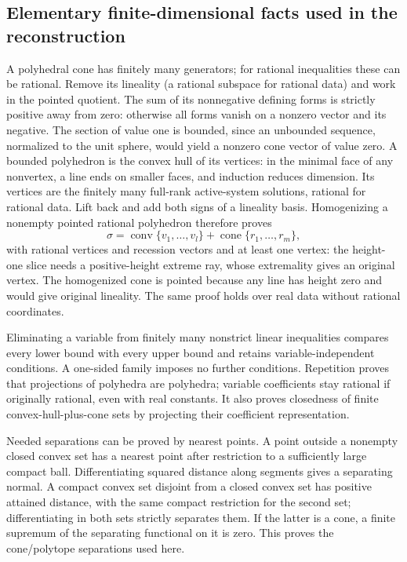 \documentclass[
  11pt,
]{article}
\begin{document}
\subsection{Elementary finite-dimensional facts used in the
reconstruction}\label{elementary-finite-dimensional-facts-used-in-the-reconstruction}

A polyhedral cone has finitely many generators; for rational
inequalities these can be rational. Remove its lineality (a rational
subspace for rational data) and work in the pointed quotient. The sum of
its nonnegative defining forms is strictly positive away from zero:
otherwise all forms vanish on a nonzero vector and its negative. The
section of value one is bounded, since an unbounded sequence, normalized
to the unit sphere, would yield a nonzero cone vector of value zero. A
bounded polyhedron is the convex hull of its vertices: in the minimal
face of any nonvertex, a line ends on smaller faces, and induction
reduces dimension. Its vertices are the finitely many full-rank
active-system solutions, rational for rational data. Lift back and add
both signs of a lineality basis. Homogenizing a nonempty pointed
rational polyhedron therefore proves \[
 \sigma=\operatorname{conv}\{v_1,\ldots,v_l\}
                    +\operatorname{cone}\{r_1,\ldots,r_m\},     \tag{8}
\] with rational vertices and recession vectors and at least one vertex:
the height-one slice needs a positive-height extreme ray, whose
extremality gives an original vertex. The homogenized cone is pointed
because any line has height zero and would give original lineality. The
same proof holds over real data without rational coordinates.

Eliminating a variable from finitely many nonstrict linear inequalities
compares every lower bound with every upper bound and retains
variable-independent conditions. A one-sided family imposes no further
conditions. Repetition proves that projections of polyhedra are
polyhedra; variable coefficients stay rational if originally rational,
even with real constants. It also proves closedness of finite
convex-hull-plus-cone sets by projecting their coefficient
representation.

Needed separations can be proved by nearest points. A point outside a
nonempty closed convex set has a nearest point after restriction to a
sufficiently large compact ball. Differentiating squared distance along
segments gives a separating normal. A compact convex set disjoint from a
closed convex set has positive attained distance, with the same compact
restriction for the second set; differentiating in both sets strictly
separates them. If the latter is a cone, a finite supremum of the
separating functional on it is zero. This proves the cone/polytope
separations used here.
\end{document}

